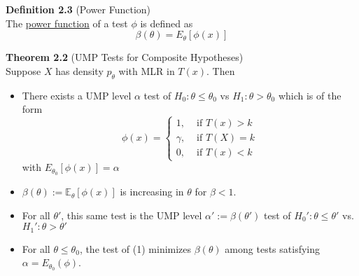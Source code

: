 \documentclass[12pt]{article}
\newcommand{\E}{\mathbb{E}}
\numberwithin{equation}{section}
\begin{document}
\textbf{Definition 2.3} (Power Function) \\
The \underline{power function} of a test $\phi$ is defined as
\begin{equation*}
  \beta(\theta) = E_{\theta}[\phi(x)]
\end{equation*}

\textbf{Theorem 2.2} (UMP Tests for Composite Hypotheses) \\
Suppose $X$ has density $p_{\theta}$ with MLR in $T(x)$. Then
\begin{itemize}
  \item There exists a UMP level $\alpha$ test of $H_0: \theta \le \theta_0$ vs $H_1: \theta > \theta_0$ which is of the form
  \begin{equation*}
    \phi(x) = 
    \begin{cases}
      1,           & \text{ if } T(x) > k \\
      \gamma,      & \text{ if } T(X) = k \\
      0,           & \text{ if } T(x) < k
    \end{cases}
  \end{equation*}
  with $E_{\theta_0}[\phi(x)] = \alpha$
  \item $\beta(\theta) := \E_{\theta}[\phi(x)]$ is increasing in $\theta$ for $\beta < 1$.
  \item For all $\theta'$, this same test is the UMP level $\alpha' := \beta(\theta')$ test of $H_0': \theta \le \theta'$ vs. $H_1': \theta > \theta'$
  \item For all $\theta \le \theta_0$, the test of (1) minimizes $\beta(\theta)$ among tests satisfying $\alpha = E_{\theta_0}(\phi)$.
\end{itemize}
\end{document}
